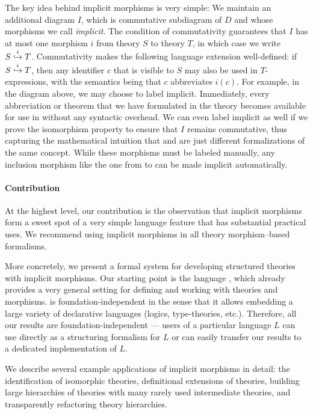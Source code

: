 The key idea behind implicit morphisms is very simple:
We maintain an additional diagram $I$, which is commutative subdiagram of $D$ and whose morphisms we call \emph{implicit}.
The condition of commutativity guarantees that $I$ has at most one morphism $i$ from theory $S$ to theory $T$, in which case we write $\ipc{i}{S}{T}$.
Commutativity makes the following language extension well-defined: if $\ipc{i}{S}{T}$, then any identifier $c$ that is visible to $S$ may also be used in $T$-expressions, with the semantics being that $c$ abbreviates $i(c)$.
For example, in the diagram above, we may choose to label  implicit.
Immediately, every abbreviation or theorem that we have formulated in the theory  becomes available for use in  without any syntactic overhead.
We can even label  implicit as well if we prove the isomorphism property to ensure that $I$ remains commutative, thus capturing the mathematical intuition that  and  are just different formalizations of the same concept.
While these morphisms must be labeled manually, any inclusion morphism like the one from  to  can be made implicit automatically.

\paragraph{Contribution}
At the highest level, our contribution is the observation that implicit morphisms form a sweet spot of a very simple language feature that has substantial practical uses.
We recommend using implicit morphisms in all theory morphism--based formalisms.

More concretely, we present a formal system for developing structured theories with implicit morphisms.
Our starting point is the \mmt language \cite{RK:mmt:10}, which already provides a very general setting for defining and working with theories and morphisms.
\mmt is foundation-independent in the sense that it allows embedding a large variety of declarative languages (logics, type-theories, etc.).
Therefore, all our results are foundation-independent --- users of a particular language $L$ can use \mmt directly as a structuring formalism for $L$ or can easily transfer our results to a dedicated implementation of $L$.

We describe several example applications of implicit morphisms in detail: the identification of isomorphic theories, definitional extensions of theories, building large hierarchies of theories with many rarely used intermediate theories, and transparently refactoring theory hierarchies.

